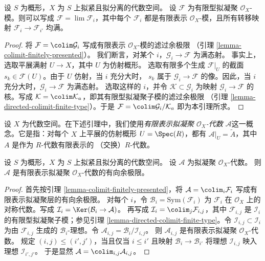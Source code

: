 \begin{lemma}
\label{lemma-finite-directed-colimit-surjective-maps}
设 $S$ 为概形，$X$ 为 $S$ 上拟紧且拟分离的代数空间。
设 $\mathcal{F}$ 为有限型拟凝聚 $\mathcal{O}_X$-模。则可以写成
$\mathcal{F} = \lim \mathcal{F}_i$，其中每个 $\mathcal{F}_i$
都是有限表示 $\mathcal{O}_X$-模，且所有转移映射
$\mathcal{F}_i \to \mathcal{F}_{i'}$ 均满。
\end{lemma}

\begin{proof}
将 $\mathcal{F} = \colim \mathcal{G}_i$ 写成有限表示
$\mathcal{O}_X$-模的滤过余极限
（引理 \ref{lemma-colimit-finitely-presented}）。
我们断言，对某个 $i$，$\mathcal{G}_i \to \mathcal{F}$ 为满态射。
事实上，选取平展满射 $U \to X$，其中 $U$ 为仿射概形。
选取有限多个生成 $\mathcal{F}|_U$ 的截面
$s_k \in \mathcal{F}(U)$。由于 $U$ 仿射，当 $i$ 充分大时，
$s_k$ 属于 $\mathcal{G}_i \to \mathcal{F}$ 的像。因此，当 $i$
充分大时，$\mathcal{G}_i \to \mathcal{F}$ 为满态射。
选取这样的 $i$，并令 $\mathcal{K} \subset \mathcal{G}_i$
为映射 $\mathcal{G}_i \to \mathcal{F}$ 的核。写成
$\mathcal{K} = \colim \mathcal{K}_a$，即其有限型拟凝聚子模的滤过余极限
（引理 \ref{lemma-directed-colimit-finite-type}）。于是
$\mathcal{F} = \colim \mathcal{G}_i/\mathcal{K}_a$ 即为本引理所求。
\end{proof}

\noindent
设 $X$ 为代数空间。在下述引理中，我们使用{\it 有限表示拟凝聚
$\mathcal{O}_X$-代数 $\mathcal{A}$}这一概念。它是指：对每个
$X$ 上平展的仿射概形 $U = \Spec(R)$，都有
$\mathcal{A}|_U = \widetilde{A}$，其中 $A$ 是作为 $R$-代数有限表示的
（交换）$R$-代数。

\begin{lemma}
\label{lemma-algebra-directed-colimit-finite-presentation}
设 $S$ 为概形，$X$ 为 $S$ 上拟紧且拟分离的代数空间。
设 $\mathcal{A}$ 为拟凝聚 $\mathcal{O}_X$-代数。
则 $\mathcal{A}$ 是有限表示拟凝聚 $\mathcal{O}_X$-代数的有向余极限。
\end{lemma}

\begin{proof}
首先按引理 \ref{lemma-colimit-finitely-presented}，将
$\mathcal{A} = \colim_i \mathcal{F}_i$ 写成有限表示拟凝聚层的有向余极限。
对每个 $i$，令 $\mathcal{B}_i = \text{Sym}(\mathcal{F}_i)$
为 $\mathcal{F}_i$ 在 $\mathcal{O}_X$ 上的对称代数。写成
$\mathcal{I}_i = \Ker(\mathcal{B}_i \to \mathcal{A})$。
再写成 $\mathcal{I}_i = \colim_j \mathcal{F}_{i,j}$，其中
$\mathcal{F}_{i,j}$ 是 $\mathcal{I}_i$ 的有限型拟凝聚子模；参见引理
\ref{lemma-directed-colimit-finite-type}。令
$\mathcal{I}_{i,j} \subset \mathcal{I}_i$ 为由
$\mathcal{F}_{i,j}$ 生成的 $\mathcal{B}_i$-理想。令
$\mathcal{A}_{i,j} = \mathcal{B}_i/\mathcal{I}_{i,j}$。
则 $\mathcal{A}_{i,j}$ 是有限表示拟凝聚 $\mathcal{O}_X$-代数。
规定 $(i,j) \leq (i',j')$，当且仅当 $i \leq i'$ 且映射
$\mathcal{B}_i \to \mathcal{B}_{i'}$ 将理想
$\mathcal{I}_{i,j}$ 映入理想 $\mathcal{I}_{i',j'}$。
于是显然 $\mathcal{A} = \colim_{i,j} \mathcal{A}_{i,j}$。
\end{proof}


